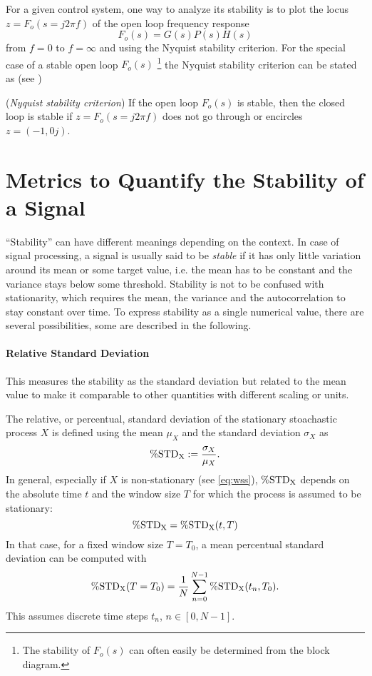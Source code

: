 For a given control system, one way to analyze its stability is to plot the locus $z=F_o(s=j2\pi f)$ of the open loop frequency response
\begin{equation}
F_o(s) = G(s)P(s)H(s)
\end{equation}
from $f=0$ to $f=\infty$ and using the Nyquist stability criterion.
For the special case of a stable open loop $F_o(s)$ \footnote{The stability of $F_o(s)$ can often easily be determined from the block diagram.} the Nyquist stability criterion can be stated as (see \cite[p.~111]{Foellinger2016})
\begin{definition}\label{def:Nyquist}
(\textit{Nyquist stability criterion}) If the open loop $F_o(s)$ is stable, then the closed loop is stable if $z=F_o(s=j2\pi f)$ does not go through or encircles $z=(-1,0j)$.
\end{definition}

\newpage
\section{Metrics to Quantify the Stability of a Signal}\label{sec:metrics}
``Stability'' can have different meanings depending on the context. In case of signal processing, a signal is usually said to be \textit{stable} if it has only little variation around its mean or some target value, i.e. the mean has to be constant and the variance stays below some threshold. 
Stability is not to be confused with stationarity, which requires the mean, the variance and the autocorrelation to stay constant over time. \cite{Guthrie2020} 
To express stability as a single numerical value, there are several possibilities, some are described in the following.

\paragraph{Relative Standard Deviation}
This measures the stability as the standard deviation but related to the mean value to make it comparable to other quantities with different scaling or units.

The relative, or percentual, standard deviation of the stationary stoachastic process $X$ is defined using the mean $\mu_X$ and the standard deviation $\sigma_X$ as
\begin{equation}
\operatorname{\%STD_X} := \frac{\sigma_X}{\mu_X}.
\end{equation}
In general, especially if $X$ is non-stationary (see \autoref{eq:wss}), $\operatorname{\%STD_X}$ depends on the absolute time $t$ and the window size $T$ for which the process is assumed to be stationary:
\begin{equation}
\operatorname{\%STD_X} = \operatorname{\%STD_X}(t,T)
\end{equation}
In that case, for a fixed window size $T=T_0$, a mean percentual standard deviation can be computed with 
\begin{equation}\label{eq:stdp}
\operatorname{\%STD_X}(T=T_0) = \frac{1}{N} \sum_{n=0}^{N-1} \operatorname{\%STD_X}(t_n,T_0).
\end{equation}
This assumes discrete time steps $t_n$, $n\in[0,N-1]$.

